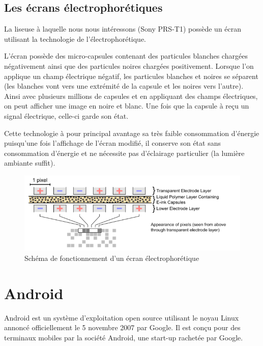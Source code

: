 \newpage

\subsection{Les écrans électrophorétiques}

La liseuse à laquelle nous nous intéressons (Sony PRS-T1) possède un écran utilisant la technologie de l'électrophorétique.

L'écran possède des micro-capsules contenant des particules blanches chargées négativement ainsi que des particules noires chargées positivement. Lorsque l'on applique un champ électrique négatif, les particules blanches et noires se séparent (les blanches vont vers une extrémité de la capsule et les noires vers l'autre). Ainsi avec plusieurs millions de capsules et en appliquant des champs électriques, on peut afficher une image en noire et blanc. Une fois que la capsule à reçu un signal électrique, celle-ci garde son état.

Cette technologie à pour principal avantage sa très faible consommation d'énergie puisqu'une fois l'affichage de l'écran modifié, il conserve son état sans consommation d'énergie et ne nécessite pas d'éclairage particulier (la lumière ambiante suffit).

\begin{figure}[h!]
\begin{center}
	\includegraphics{Electrophoretic.png}
	\caption{Schéma de fonctionnement d'un écran électrophorétique}
\end{center}
\end{figure}

\newpage

\section{Android}
Android est un système d'exploitation open source utilisant le noyau Linux annoncé officiellement le 5 novembre 2007 par Google. Il est conçu pour des terminaux mobiles par la société Android, une start-up rachetée par Google.


